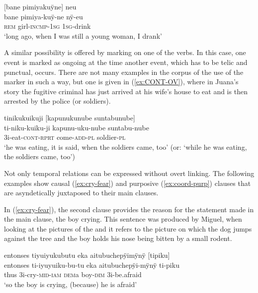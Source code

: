 \ea\label{ex:drank-before}
\begingl
\glpreamble \textup{[}bane pimiyakuÿne\textup{]} neu\\
\gla bane pimiya-kuÿ-ne nÿ-eu\\
\glb \textsc{rem} girl-\textsc{incmp}-1\textsc{sg} 1\textsc{sg}-drink\\
\glft ‘long ago, when I was still a young woman, I drank’
\endgl
\trailingcitation{[cux-c120414ls-1.031]}
\xe

A similar possibility is offered by  marking on one of the verbs. In this case, one event is marked as ongoing at the time another event, which has to be telic and punctual, occurs. There are not many examples in the corpus of the use of the  marker in such a way, but one is given in (\ref{ex:CONT-OV}), where in Juana’s story the fugitive criminal has just arrived at his wife’s house to eat and is then arrested by the police (or soldiers).

\ea\label{ex:CONT-OV}
\begingl
\glpreamble tinikukuikuji \textup{[}kapunukunube suntabunube\textup{]}\\
\gla ti-niku-kuiku-ji kapunu-uku-nube suntabu-nube\\
\glb 3i-eat-\textsc{cont}-\textsc{rprt} come-\textsc{add}-\textsc{pl} soldier-\textsc{pl}\\
\glft ‘he was eating, it is said, when the soldiers came, too’ (or: ‘while he was eating, the soldiers came, too’)
\endgl
\trailingcitation{[jxx-p120430l-2.151]}
\xe

Not only temporal relations can be expressed without overt linking. The following examples show causal (\ref{ex:cry-fear}) and purposive (\ref{ex:coord-purp}) clauses that are asyndetically juxtaposed to their main clauses.

In (\ref{ex:cry-fear}), the second clause provides the reason for the statement made in the main clause, the boy crying. This sentence was produced by Miguel, when looking at the pictures of the  and it refers to the picture on which the dog jumps against the tree and the boy holds his nose being bitten by a small rodent.

\ea\label{ex:cry-fear}
\begingl
\glpreamble entonses tiyuiyukubutu eka aitubuchepÿimÿnÿ \textup{[}tipiku\textup{]}\\
\gla entonses ti-iyuyuiku-bu-tu eka aitubuchepÿi-mÿnÿ ti-piku\\
\glb thus 3i-cry-\textsc{mid}-\textsc{iam} \textsc{dem}a boy-\textsc{dim} 3i-be.afraid\\
\glft ‘so the boy is crying, (because) he is afraid’
\endgl
\trailingcitation{[mox-a110920l-2.083]}
\xe



